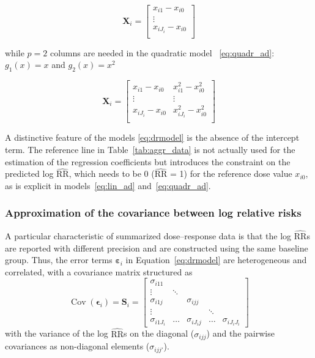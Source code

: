 \documentclass[11pt,a4paper,twoside,openany]{book}\usepackage{knitr}
\DeclareMathOperator{\Cov}{Cov}
\begin{document}
{{\begin{equation*}
 \mathbf{X}_i=\left[
\begin{array}{c}
x_{i1} - x_{i0} \\
\vdots \\
x_{iJ_i} - x_{i0} \\
\end{array}%
\right] 
\end{equation*}

\noindent while $p = 2$ columns are needed in the quadratic model ~\ref{eq:quadr_ad}: $g_1(x) = x$ and $g_2(x) = x^2$

\begin{equation*}
 \mathbf{X}_i=\left[
\begin{array}{cc}
x_{i1} - x_{i0} & x_{i1}^2 - x_{i0}^2 \\
\vdots & \vdots \\
x_{iJ_i} - x_{i0} & x_{iJ_i}^2 - x_{i0}^2 \\
\end{array}%
\right] 
\end{equation*}

\noindent A distinctive feature of the models \ref{eq:drmodel} is the absence of the intercept term. The reference line in Table~\ref{tab:aggr_data} is not actually used for the estimation of the regression coefficients but introduces the constraint on the predicted log $\widehat{\mathrm{RR}}$, which needs to be 0 ($\widehat{\mathrm{RR}}$ = 1) for the reference dose value $x_{i0}$, as is explicit in models~\ref{eq:lin_ad} and~\ref{eq:quadr_ad}.

\subsubsection*{Approximation of the covariance between log relative risks}\label{sec:cov}

\noindent A particular characteristic of summarized dose--response data is that the log $\widehat{\mathrm{RR}}$s are reported with different precision and are constructed using the same baseline group. Thus, the error terms $\boldsymbol{\varepsilon}_i$ in Equation~\ref{eq:drmodel} are heterogeneous and correlated, with a covariance matrix structured as
\begin{equation}
\Cov\left(\boldsymbol{\epsilon}_i\right) = \mathbf{S}_i = \left[
\begin{array}{ccccc}
\sigma_{i11} & \ \ & \ & & \ \\
\vdots \ & \ddots & & & \ \\
\sigma_{i1j}& \ & \sigma_{ijj}& & \ \\
\vdots & \ & \ & \ddots & \\
\sigma_{i1J_i} & \ldots & \sigma_{iJ_ij} & \ldots & \sigma_{iJ_iJ_i}
\end{array}
\right] 
\label{eq:S_i}
\end{equation}
\noindent with the variance of the log $\widehat{\mathrm{RR}}$s on the diagonal ($\sigma_{ijj}$) and the pairwise covariances as non-diagonal elements ($\sigma_{ijj'}$).

}}
\end{document}
